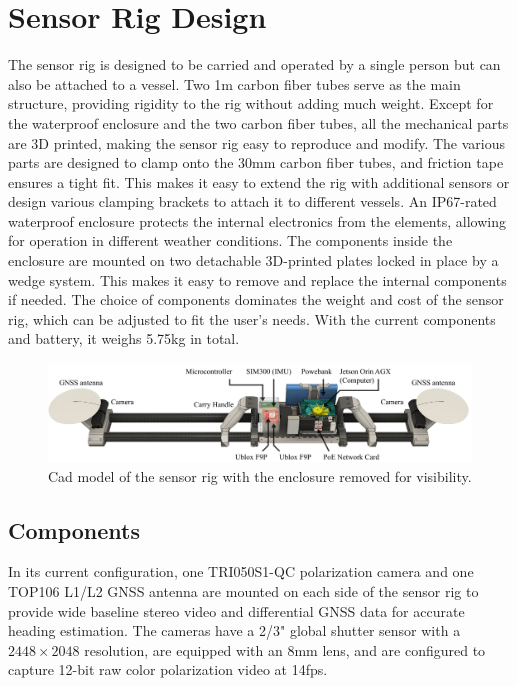 \section{Sensor Rig Design}
The sensor rig is designed to be carried and operated by a single person but can also be attached to a vessel.
Two 1m carbon fiber tubes serve as the main structure, providing rigidity to the rig without adding much weight.
Except for the waterproof enclosure and the two carbon fiber tubes, all the mechanical parts are 3D printed, making the sensor rig easy to reproduce and modify.
The various parts are designed to clamp onto the 30mm carbon fiber tubes, and friction tape ensures a tight fit.
This makes it easy to extend the rig with additional sensors or design various clamping brackets to attach it to different vessels.
An IP67-rated waterproof enclosure protects the internal electronics from the elements, allowing for operation in different weather conditions.
The components inside the enclosure are mounted on two detachable 3D-printed plates locked in place by a wedge system. This makes it easy to remove and replace the internal components if needed.
The choice of components dominates the weight and cost of the sensor rig, which can be adjusted to fit the user's needs.
With the current components and battery, it weighs 5.75kg in total.

\begin{figure}[H]
    \centering
    \includegraphics[width=\textwidth]{figures/rig_components.pdf}
    \caption{Cad model of the sensor rig with the enclosure removed for visibility.}
\end{figure}

\subsection{Components}
In its current configuration, one TRI050S1-QC polarization camera and one TOP106 L1/L2 GNSS antenna are mounted on each side of the sensor rig to provide wide baseline stereo video and differential GNSS data for accurate heading estimation.
The cameras have a 2/3" global shutter sensor with a $2448\times2048$ resolution, are equipped with an 8mm lens, and are configured to capture 12-bit raw color polarization video at 14fps.


